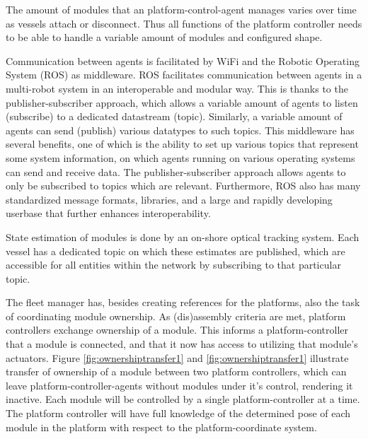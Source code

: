 The amount of modules that an platform-control-agent manages varies over time as vessels attach or disconnect. Thus all functions of the platform controller needs to be able to handle a variable amount of modules and configured shape. 

Communication between agents is facilitated by WiFi and the Robotic Operating System (ROS) as middleware. ROS facilitates communication between agents in a multi-robot system in an interoperable and modular way. This is thanks to the publisher-subscriber approach, which allows a variable amount of agents to listen (subscribe) to a dedicated datastream (topic). Similarly, a variable amount of agents can send (publish) various datatypes to such topics. This middleware has several benefits, one of which is the ability to set up various topics that represent some system information, on which agents running on various operating systems can send and receive data. The publisher-subscriber approach allows agents to only be subscribed to topics which are relevant. Furthermore, ROS also has many standardized message formats, libraries, and a large and rapidly developing userbase that further enhances interoperability.

State estimation of modules is done by an on-shore optical tracking system. Each vessel has a dedicated topic on which these estimates are published, which are accessible for all entities within the network by subscribing to that particular topic. 

The fleet manager has, besides creating references for the platforms, also the task of coordinating module ownership. As (dis)assembly criteria are met, platform controllers exchange ownership of a module. This informs a platform-controller that a module is connected, and that it now has access to utilizing that module's actuators. Figure \ref{fig:ownershiptransfer1} and \ref{fig:ownershiptransfer1} illustrate transfer of ownership of a module between two platform controllers, which can leave platform-controller-agents without modules under it's control, rendering it inactive. 
Each module will be controlled by a single platform-controller at a time. The platform controller will have full knowledge of the determined pose of each module in the platform with respect to the platform-coordinate system. 


